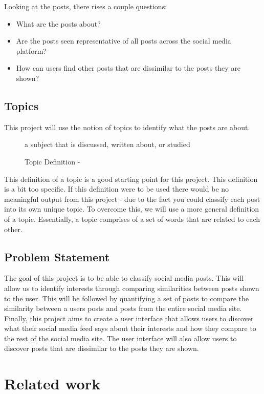 Looking at the posts, there rises a couple questions:
\begin{itemize}
    \item What are the posts about?
    \item Are the posts seen representative of all posts across the social media platform?
    \item How can users find other posts that are dissimilar to the posts they are shown?
\end{itemize}

\subsection{Topics}
This project will use the notion of topics to identify what the posts are about.
\begin{figure}[hbtp]
    \centering
    a subject that is discussed, written about, or studied
    \caption{Topic Definition - \cite{cambdict}}
    \label{fig:topic_definition}
\end{figure}

This definition of a topic is a good starting point for this project. This definition is a bit too specific. If this definition were 
to be used there would be no meaningful output from this project - due to the fact you could classify each post into its own unique
topic. To overcome this, we will use a more general definition of a topic. Essentially, a topic comprises of a set of words that
are related to each other.

\subsection{Problem Statement}
The goal of this project is to be able to classify social media posts. This will allow us to identify interests through comparing
similarities between posts shown to the user. This will be followed by quantifying a set of posts to compare the similarity between
a users posts and posts from the entire social media site. Finally, this project aims to create a user interface that allows users
to discover what their social media feed says about their interests and how they compare to the rest of the social media site. The
user interface will also allow users to discover posts that are dissimilar to the posts they are shown.


\section{Related work}
